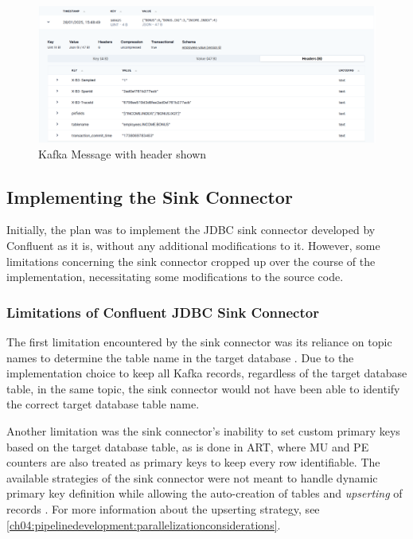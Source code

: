 \begin{figure}[htbp]
 \centering
 \includegraphics[width=1\textwidth]{chapters/images/header-example.png}
 \caption{Kafka Message with header shown}
 \label{fig:chapter04:implementation:headerexample}
\end{figure}


\subsection{Implementing the Sink Connector}
Initially, the plan was to implement the \ac{JDBC} sink connector developed by Confluent as it is, without any additional modifications to it. However, some limitations concerning the sink connector cropped up over the course of the implementation, necessitating some modifications to the source code.

\subsubsection{Limitations of Confluent JDBC Sink Connector}
The first limitation encountered by the sink connector was its reliance on topic names to determine the table name in the target database \cite{jdbcsinkdocumentation}. Due to the implementation choice to keep all Kafka records, regardless of the target database table, in the same topic, the sink connector would not have been able to identify the correct target database table name.

Another limitation was the sink connector's inability to set custom primary keys based on the target database table, as is done in \ac{ART}, where MU and PE counters are also treated as primary keys to keep every row identifiable. The available strategies of the sink connector were not meant to handle dynamic primary key definition while allowing the auto-creation of tables and \textit{upserting} of records \cite{jdbcsinkdocumentation}. For more information about the upserting strategy, see \ref{ch04:pipelinedevelopment:parallelizationconsiderations}.

